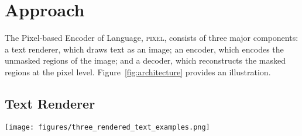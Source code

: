 \documentclass{article}
\newcommand{\model}{\textsc{pixel}\xspace}
\begin{document}
\vspace{-2mm}
\section{Approach}
\vspace{-3mm}

The Pixel-based Encoder of Language, \model, consists of three major components: a text renderer, which draws text as an image; an encoder, which encodes the unmasked regions of the image; and a decoder, which reconstructs the masked regions at the pixel level. Figure~\ref{fig:architecture} provides an illustration.

\vspace{-3mm}
\subsection{Text Renderer}
\vspace{-2mm}

\label{sec:renderer}

\begin{figure*}[t]
    \texttt{[image: figures/three\_rendered\_text\_examples.png]}
    \caption{Illustrative examples of our rendered text. \model natively supports most writing systems, colour emoji (a), and complex text layouts such as right-to-left writing and ligatures (b). Black patches serve as separators and end-of-sequence markers. Blank patches to the right of the end-of-sequence marker are treated as sequence padding. For word-level tasks, horizontal spacing can be added between words (c) so that every patch can be assigned to exactly one word (dotted lines indicate patch boundaries for demonstration).} 
    \label{fig:rendered_examples}
    \vspace{-2mm}
\end{figure*}
\end{document}
